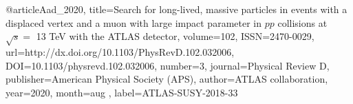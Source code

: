 @article{Aad_2020, 
    title={Search for long-lived, 
    massive particles in events with a displaced vertex and a muon with large impact parameter in $pp$ collisions at $\sqrt{s} =$ 13 TeV with the ATLAS detector}, 
    volume={102}, 
    ISSN={2470-0029}, 
    url={http://dx.doi.org/10.1103/PhysRevD.102.032006}, 
    DOI={10.1103/physrevd.102.032006}, 
    number={3}, 
    journal={Physical Review D}, 
    publisher={American Physical Society (APS)}, 
    author={ATLAS collaboration}, 
    year={2020}, 
    month=aug ,
    label={ATLAS-SUSY-2018-33}
}

